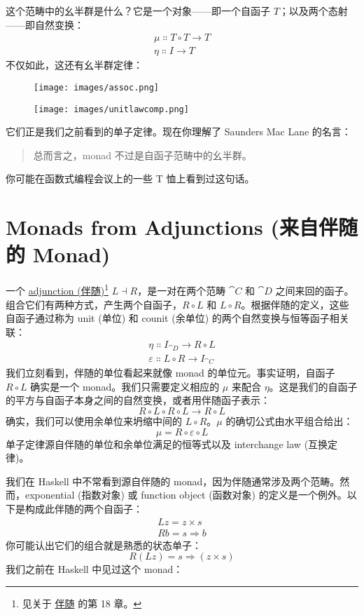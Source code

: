 这个范畴中的幺半群是什么？它是一个对象——即一个自函子 $T$；以及两个态射——即自然变换：
\begin{gather*}
  \mu \Colon T \circ T \to T \\
  \eta \Colon I \to T
\end{gather*}
不仅如此，这还有幺半群定律：

\begin{figure}[H]
  \centering
  \texttt{[image: images/assoc.png]}
\end{figure}

\begin{figure}[H]
  \centering
  \texttt{[image: images/unitlawcomp.png]}
\end{figure}

\noindent
它们正是我们之前看到的单子定律。现在你理解了 Saunders Mac Lane 的名言：

\begin{quote}
  总而言之，monad 不过是自函子范畴中的幺半群。
\end{quote}
你可能在函数式编程会议上的一些 T 恤上看到过这句话。

\section{Monads from Adjunctions (来自伴随的 Monad)}

一个 \hyperref[adjunctions]{adjunction (伴随)}\footnote{见关于 \hyperref[adjunctions]{伴随} 的第 18 章。} $L \dashv R$，是一对在两个范畴 $\cat{C}$ 和 $\cat{D}$ 之间来回的函子。组合它们有两种方式，产生两个自函子，$R \circ L$ 和 $L \circ R$。根据伴随的定义，这些自函子通过称为 unit (单位) 和 counit (余单位) 的两个自然变换与恒等函子相关联：
\begin{gather*}
  \eta \Colon I_{\cat{D}} \to R \circ L \\
  \varepsilon \Colon L \circ R \to I_{\cat{C}}
\end{gather*}
我们立刻看到，伴随的单位看起来就像 monad 的单位元。事实证明，自函子 $R \circ L$ 确实是一个 monad。我们只需要定义相应的 $\mu$ 来配合 $\eta$。这是我们的自函子的平方与自函子本身之间的自然变换，或者用伴随函子表示：
\[R \circ L \circ R \circ L \to R \circ L\]
确实，我们可以使用余单位来坍缩中间的 $L \circ R$。$\mu$ 的确切公式由水平组合给出：
\[\mu = R \circ \varepsilon \circ L\]
单子定律源自伴随的单位和余单位满足的恒等式以及 interchange law (互换定律)。

我们在 Haskell 中不常看到源自伴随的 monad，因为伴随通常涉及两个范畴。然而，exponential (指数对象) 或 function object (函数对象) 的定义是一个例外。以下是构成此伴随的两个自函子：
\begin{gather*}
  L z = z\times{}s \\
  R b = s \Rightarrow b
\end{gather*}
你可能认出它们的组合就是熟悉的状态单子：
\[R (L z) = s \Rightarrow (z\times{}s)\]
我们之前在 Haskell 中见过这个 monad：

